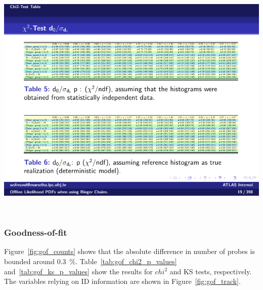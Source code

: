 \begin{table}[t]
\begin{subtable}{\textwidth}
\caption{\dOSignificance{}\label{tab:p_values_d0sig}}
\includegraphics[width=\textwidth]{appendices/figures/homogeneity/d0significance_homogeneity_table}
\end{subtable} \\
\end{table}

\FloatBarrier
\subsubsection{Goodness-of-fit}%
\label{top:gof_extra}

Figure~\ref{fig:gof_counts} shows that the absolute difference in number of
probes is bounded around \SI{0.3}{\%}.
Table~\ref{tab:gof_chi2_p_values} and~\ref{tab:gof_ks_p_values} show the results
for $chi^2$ and KS tests, respectively. The variables relying on ID information
are shown in Figure~\ref{fig:gof_track}.

